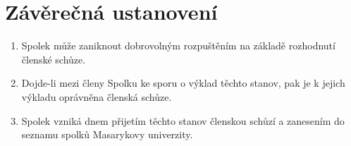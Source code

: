 \documentclass[11pt,a4paper]{article}
\begin{document}
\section{Závěrečná ustanovení}
\begin{enumerate}[itemsep=0pt]
    \item Spolek může zaniknout dobrovolným rozpuštěním na základě rozhodnutí
    členské schůze.
    \item Dojde-li mezi členy Spolku ke sporu o výklad těchto stanov, pak je 
    k jejich výkladu oprávněna členská schůze.
    \item Spolek vzniká dnem přijetím těchto stanov členskou schůzí a zanesením 
    do seznamu spolků Masarykovy univerzity.
\end{enumerate}
\end{document}
